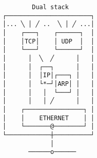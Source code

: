 \documentclass[varwidth,crop]{standalone}
\begin{document}
\begin{verbatim}
        Dual stack
┌───────────────────────┐
│... ╲ │ ╱ ..  ╲ │ ╱ ...│
│    ┌───┐    ┌──────┐  │
│    │TCP│    │ UDP  │  │
│    └───┘    └──────┘  │
│      │  ╲  ╱      │   │
│      │  ┌──┐      │   │
│      │  │IP│┌───┐ │   │
│      │  └*─┘│ARP│ │   │
│      │   │  └───┘ │   │
│      │   │ ╱      │   │
│    ┌────────────────┐ │
│    │    ETHERNET    │ │
│    └───────@────────┘ │
└────────────┼──────────┘
             │
       ──────o──────
\end{verbatim}
\end{document}
